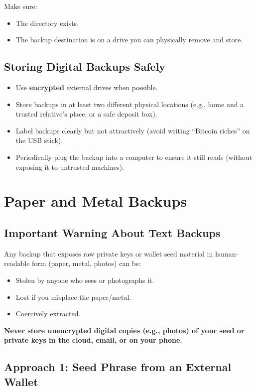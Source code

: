 \documentclass[12pt,a4paper]{book}
\begin{document}
Make sure:
\begin{itemize}
  \item The directory exists.
  \item The backup destination is on a drive you can physically remove and store.
\end{itemize}

\section{Storing Digital Backups Safely}

\begin{itemize}
  \item Use \textbf{encrypted} external drives when possible.
  \item Store backups in at least two different physical locations (e.g., home and a trusted relative's place, or a safe deposit box).
  \item Label backups clearly but not attractively (avoid writing \enquote{Bitcoin riches} on the USB stick).
  \item Periodically plug the backup into a computer to ensure it still reads (without exposing it to untrusted machines).
\end{itemize}

\chapter{Paper and Metal Backups}

\section{Important Warning About Text Backups}

Any backup that exposes raw private keys or wallet seed material in human-readable form (paper, metal, photos) can be:
\begin{itemize}
  \item Stolen by anyone who sees or photographs it.
  \item Lost if you misplace the paper/metal.
  \item Coercively extracted.
\end{itemize}

\textbf{Never store unencrypted digital copies (e.g., photos) of your seed or private keys in the cloud, email, or on your phone.}

\section{Approach 1: Seed Phrase from an External Wallet}
\end{document}
